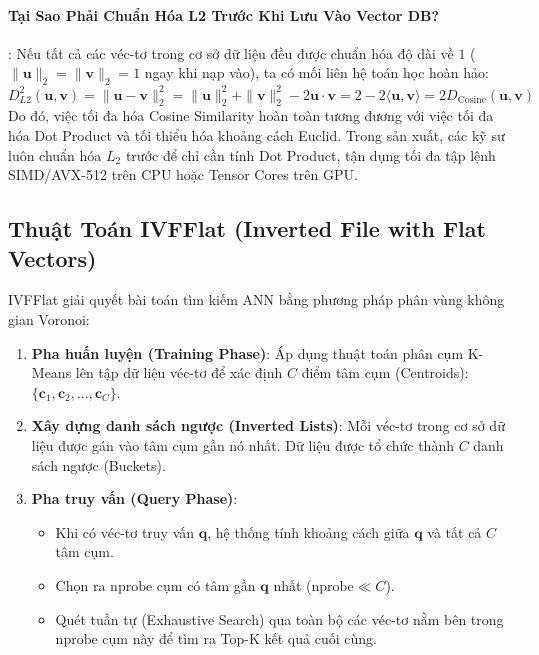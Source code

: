 \paragraph{Tại Sao Phải Chuẩn Hóa L2 Trước Khi Lưu Vào Vector DB?}:
Nếu tất cả các véc-tơ trong cơ sở dữ liệu đều được chuẩn hóa độ dài về $1$ ($\|\mathbf{u}\|_2 = \|\mathbf{v}\|_2 = 1$ ngay khi nạp vào), ta có mối liên hệ toán học hoàn hảo:
\begin{equation}
D_{L2}^2(\mathbf{u}, \mathbf{v}) = \|\mathbf{u} - \mathbf{v}\|_2^2 = \|\mathbf{u}\|_2^2 + \|\mathbf{v}\|_2^2 - 2 \mathbf{u} \cdot \mathbf{v} = 2 - 2 \langle \mathbf{u}, \mathbf{v} \rangle = 2 D_{\text{Cosine}}(\mathbf{u}, \mathbf{v})
\end{equation}
Do đó, việc tối đa hóa Cosine Similarity hoàn toàn tương đương với việc tối đa hóa Dot Product và tối thiểu hóa khoảng cách Euclid. Trong sản xuất, các kỹ sư luôn chuẩn hóa $L_2$ trước để chỉ cần tính Dot Product, tận dụng tối đa tập lệnh SIMD/AVX-512 trên CPU hoặc Tensor Cores trên GPU.

\subsection{Thuật Toán IVFFlat (Inverted File with Flat Vectors)}
IVFFlat giải quyết bài toán tìm kiếm ANN bằng phương pháp phân vùng không gian Voronoi:
\begin{enumerate}
  \item \textbf{Pha huấn luyện (Training Phase)}: Áp dụng thuật toán phân cụm K-Means lên tập dữ liệu véc-tơ để xác định $C$ điểm tâm cụm (Centroids): $\{\mathbf{c}_1, \mathbf{c}_2, \dots, \mathbf{c}_C\}$.
  \item \textbf{Xây dựng danh sách ngược (Inverted Lists)}: Mỗi véc-tơ trong cơ sở dữ liệu được gán vào tâm cụm gần nó nhất. Dữ liệu được tổ chức thành $C$ danh sách ngược (Buckets).
  \item \textbf{Pha truy vấn (Query Phase)}:
  \begin{itemize}
    \item Khi có véc-tơ truy vấn $\mathbf{q}$, hệ thống tính khoảng cách giữa $\mathbf{q}$ và tất cả $C$ tâm cụm.
    \item Chọn ra $\text{nprobe}$ cụm có tâm gần $\mathbf{q}$ nhất ($\text{nprobe} \ll C$).
    \item Quét tuần tự (Exhaustive Search) qua toàn bộ các véc-tơ nằm bên trong $\text{nprobe}$ cụm này để tìm ra Top-K kết quả cuối cùng.
  \end{itemize}
\end{enumerate}

